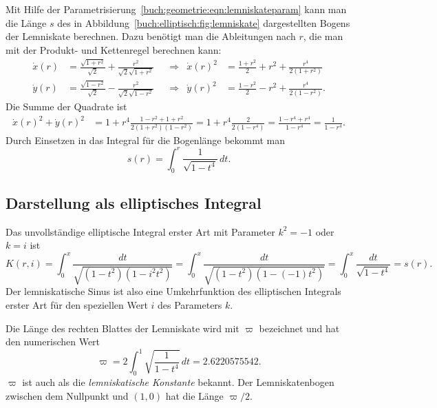 Mit Hilfe der Parametrisierung~\eqref{buch:geometrie:eqn:lemniskateparam}
kann man die Länge $s$ des in Abbildung~\ref{buch:elliptisch:fig:lemniskate}
dargestellten Bogens der Lemniskate berechnen.
Dazu benötigt man die Ableitungen nach $r$, die man mit der Produkt- und
Kettenregel berechnen kann:
\begin{align*}
\dot{x}(r)
&=
\frac{\sqrt{1+r^2}}{\sqrt{2}}
+
\frac{r^2}{\sqrt{2}\sqrt{1+r^2}}
&&\Rightarrow&
\dot{x}(r)^2
&=
\frac{1+r^2}{2} +r^2 + \frac{r^4}{2(1+r^2)}
\\
\dot{y}(r)
&=
\frac{\sqrt{1-r^2}}{\sqrt{2}}
-
\frac{r^2}{\sqrt{2}\sqrt{1-r^2}}
&&\Rightarrow&
\dot{y}(r)^2
&=
\frac{1-r^2}{2} -r^2 + \frac{r^4}{2(1-r^2)}.
\end{align*}
Die Summe der Quadrate ist
\begin{align*}
\dot{x}(r)^2 + \dot{y}(r)^2
&=
1 + r^4\frac{1-r^2+1+r^2}{2(1+r^2)(1-r^2)}
=
1+r^4\frac{2}{2(1-r^4)}
=
\frac{1-r^4+r^4}{1-r^4}
=
\frac1{1-r^4}.
\end{align*}
Durch Einsetzen in das Integral für die Bogenlänge bekommt man
\begin{equation}
s(r)
=
\int_0^r
\frac{1}{\sqrt{1-t^4}}\,dt.
\label{buch:elliptisch:eqn:lemniskatebogenlaenge}
\end{equation}

%
%
\subsection{Darstellung als elliptisches Integral}
Das unvollständige elliptische Integral erster Art mit Parameter
$k^2=-1$ oder $k=i$ ist
\[
K(r,i)
=
\int_0^x \frac{dt}{\sqrt{(1-t^2)(1-i^2 t^2)}}
=
\int_0^x \frac{dt}{\sqrt{(1-t^2)(1-(-1)t^2)}}
=
\int_0^x \frac{dt}{\sqrt{1-t^4}}
=
s(r).
\]
Der lemniskatische Sinus ist also eine Umkehrfunktion des
elliptischen Integrals erster Art für den speziellen Wert $i$ des
Parameters $k$.

Die Länge des rechten Blattes der Lemniskate wird mit $\varpi$ bezeichnet
und hat den numerischen Wert
\begin{equation}
\varpi
=
2\int_0^1\sqrt{\frac{1}{1-t^4}}\,dt
=
2.6220575542.
\label{buch:elliptisch:eqn:varpi}
\end{equation}
$\varpi$ ist auch als die {\em lemniskatische Konstante} bekannt.
%
Der Lemniskatenbogen zwischen dem Nullpunkt und $(1,0)$ hat die Länge
$\varpi/2$.

%
%
